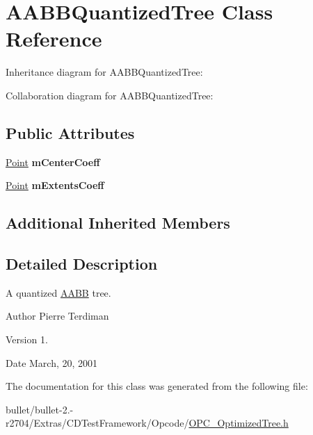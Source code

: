 \hypertarget{class_a_a_b_b_quantized_tree}{\section{A\+A\+B\+B\+Quantized\+Tree Class Reference}
\label{class_a_a_b_b_quantized_tree}
}


Inheritance diagram for A\+A\+B\+B\+Quantized\+Tree\+:


Collaboration diagram for A\+A\+B\+B\+Quantized\+Tree\+:
\subsection*{Public Attributes}
\begin{DoxyCompactItemize}
\item 
\hypertarget{class_a_a_b_b_quantized_tree_a0ac59d4d4e7476474f7e806deb5db8f5}{\hyperlink{class_point}{Point} {\bfseries m\+Center\+Coeff}}\label{class_a_a_b_b_quantized_tree_a0ac59d4d4e7476474f7e806deb5db8f5}

\item 
\hypertarget{class_a_a_b_b_quantized_tree_a44e03a9e9bc58969e9941862d85295aa}{\hyperlink{class_point}{Point} {\bfseries m\+Extents\+Coeff}}\label{class_a_a_b_b_quantized_tree_a44e03a9e9bc58969e9941862d85295aa}

\end{DoxyCompactItemize}
\subsection*{Additional Inherited Members}


\subsection{Detailed Description}
A quantized \hyperlink{class_a_a_b_b}{A\+A\+B\+B} tree.

\begin{DoxyAuthor}{Author}
Pierre Terdiman 
\end{DoxyAuthor}
\begin{DoxyVersion}{Version}
1. 
\end{DoxyVersion}
\begin{DoxyDate}{Date}
March, 20, 2001 
\end{DoxyDate}


The documentation for this class was generated from the following file\+:\begin{DoxyCompactItemize}
\item 
bullet/bullet-\/2.-\/r2704/\+Extras/\+C\+D\+Test\+Framework/\+Opcode/\hyperlink{_o_p_c___optimized_tree_8h}{O\+P\+C\+\_\+\+Optimized\+Tree.\+h}\end{DoxyCompactItemize}
